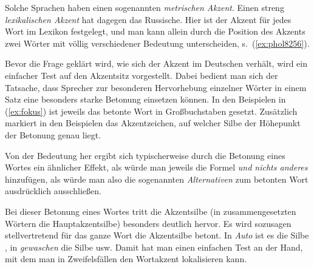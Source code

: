 \begin{exe}
\end{exe}

Solche Sprachen haben einen sogenannten \textit{metrischen Akzent}.
Einen streng \textit{lexikalischen Akzent} hat dagegen das Russische.
Hier ist der Akzent für jedes Wort im Lexikon festgelegt, und man kann allein durch die Position des Akzents zwei Wörter mit völlig verschiedener Bedeutung unterscheiden, s.\ (\ref{ex:phol8256}).

\begin{exe}
\end{exe}

Bevor die Frage geklärt wird, wie sich der Akzent im Deutschen verhält, wird ein einfacher Test auf den Akzentsitz vorgestellt.
Dabei bedient man sich der Tatsache, dass Sprecher zur besonderen Hervorhebung einzelner Wörter in einem Satz eine besonders starke Betonung einsetzen können.
In den Beispielen in (\ref{ex:fokus}) ist jeweils das betonte Wort in Großbuchstaben gesetzt.
Zusätzlich markiert in den Beispielen das Akzentzeichen, auf welcher Silbe der Höhepunkt der Betonung genau liegt.

\begin{exe}
  \ex\label{ex:fokus}
  \begin{xlist}
  \end{xlist}
\end{exe}

Von der Bedeutung her ergibt sich typischerweise durch die Betonung eines Wortes ein ähnlicher Effekt, als würde man jeweils die Formel \textit{und nichts anderes} hinzufügen, als würde man also die sogenannten \textit{Alternativen} zum betonten Wort ausdrücklich ausschließen.

\begin{exe}
  \ex\label{ex:fokus-deutlich}
  \begin{xlist}
  \end{xlist}
\end{exe}

Bei dieser Betonung eines Wortes tritt die Akzentsilbe (in zusammengesetzten Wörtern die Hauptakzentsilbe) besonders deutlich hervor.
Es wird sozusagen stellvertretend für das ganze Wort die Akzentsilbe betont.
In \textit{Auto} ist es die Silbe \textipa{[\t{aO}]}, in \textit{gewaschen} die Silbe \textipa{[vaS]} usw.
Damit hat man einen einfachen Test an der Hand, mit dem man in Zweifelsfällen den Wortakzent lokalisieren kann.

